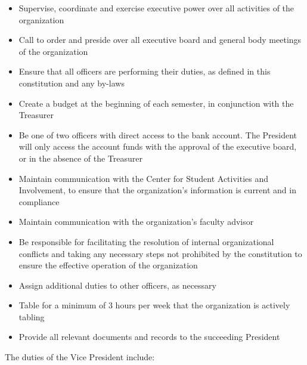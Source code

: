 \documentclass{article}
\begin{document}
\begin{itemize}
    \item Supervise, coordinate and exercise executive power over all activities of the organization
    \item Call to order and preside over all executive board and general body meetings of the organization
    \item Ensure that all officers are performing their duties, as defined in this constitution and any by-laws
    \item Create a budget at the beginning of each semester, in conjunction with the Treasurer
    \item Be one of two officers with direct access to the bank account. The President will only access the account funds with the approval of the executive board, or in the absence of the Treasurer
    \item Maintain communication with the Center for Student Activities and Involvement, to ensure that the organization’s information is current and in compliance
    \item Maintain communication with the organization’s faculty advisor
    \item Be responsible for facilitating the resolution of internal organizational conflicts and taking any necessary steps not prohibited by the constitution to ensure the effective operation of the organization
    \item Assign additional duties to other officers, as necessary
    \item Table for a minimum of 3 hours per week that the organization is actively tabling
    \item Provide all relevant documents and records to the succeeding President 
\end{itemize}

\noindent
The duties of the Vice President include:
\end{document}
